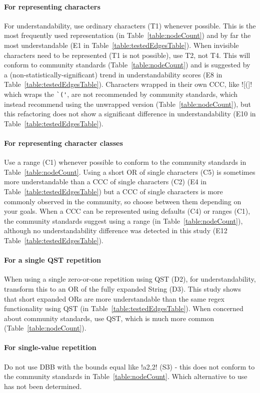 \paragraph{For representing characters}  For understandability, use ordinary characters (T1) whenever possible.  This is the most frequently used representation (in Table~\ref{table:nodeCount}) and by far the most understandable (E1 in Table~\ref{table:testedEdgesTable}).  When invisible characters need to be represented (T1 is not possible), use T2, not T4.  This will conform to community standards (Table~\ref{table:nodeCount}) and is suggested by a (non-statistically-significant) trend in understandability scores (E8 in Table~\ref{table:testedEdgesTable}).  Characters wrapped in their own CCC, like \cverb![(]! which wraps the \verb!`('!, are not recommended by community standards, which instead recommend using the unwrapped version (Table~\ref{table:nodeCount}), but this refactoring does not show a significant difference in understandability (E10 in Table~\ref{table:testedEdgesTable}).

\paragraph{For representing character classes}  Use a range (C1) whenever possible to conform to the community standards in Table~\ref{table:nodeCount}.  Using a short OR of single characters (C5) is sometimes more understandable than a CCC of single characters (C2) (E4 in Table~\ref{table:testedEdgesTable}) but a CCC of single characters is more commonly observed in the community, so choose between them depending on your goals.  When a CCC can be represented using defaults (C4) or ranges (C1), the community standards suggest using a range (in Table~\ref{table:nodeCount}), although no understandability difference was detected in this study (E12 Table~\ref{table:testedEdgesTable}).

\paragraph{For a single QST repetition}  When using a single zero-or-one repetition using QST (D2), for understandability, transform this to an OR of the fully expanded String (D3).  This study shows that short expanded ORs are more understandable than the same regex functionality using QST (in Table~\ref{table:testedEdgesTable}).  When concerned about community standards, use QST, which is much more common (Table~\ref{table:nodeCount}).

\paragraph{For single-value repetition}  Do not use DBB with the bounds equal like \cverb!a{2,2}! (S3) - this does not conform to the community standards in Table~\ref{table:nodeCount}.  Which alternative to use has not been determined.
